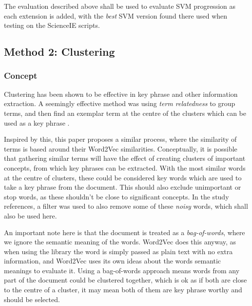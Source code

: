 The evaluation described above shall be used to evaluate SVM progression as each extension is added, with the \textit{best} SVM version found there used when testing on the ScienceIE scripts.

\subsection{Method 2: Clustering}
\subsubsection*{Concept}
Clustering has been shown to be effective in key phrase and other information extraction. A seemingly effective method was using \textit{term relatedness} to group terms, and then find an exemplar term at the centre of the clusters which can be used as a key phrase \cite{Liu2009}. 

Inspired by this, this paper proposes a similar process, where the similarity of terms is based around their Word2Vec similarities. Conceptually, it is possible that gathering similar terms will have the effect of creating clusters of important concepts, from which key phrases can be extracted. With the most similar words at the centre of clusters, these could be considered key words which are used to take a key phrase from the document. This should also exclude unimportant or stop words, as these shouldn't be close to significant concepts. In the study references, a filter was used to also remove some of these \textit{noisy} words, which shall also be used here.

An important note here is that the document is treated as a \textit{bag-of-words}, where we ignore the semantic meaning of the words. Word2Vec does this anyway, as when using the library the word is simply passed as plain text with no extra information, and Word2Vec uses its own ideas about the words semantic meanings to evaluate it. Using a bag-of-words approach means words from any part of the document could be clustered together, which is ok as if both are close to the centre of a cluster, it may mean both of them are key phrase worthy and should be selected.


